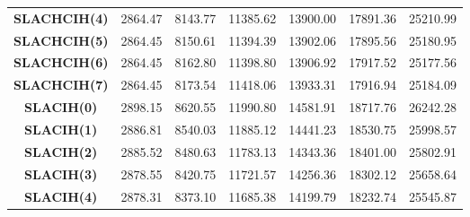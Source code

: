 \begin{landscape}
{\begin{table}[]
{\begin{tabular}{|c|cccccc|}
\textbf{SLACHCIH(4)}                 & 2864.47                        & 8143.77                        & {\color[HTML]{FE0000} 11385.62} & {\color[HTML]{FE0000} 13900.00} & {\color[HTML]{FE0000} 17891.36} & 25210.99                        \\
\rowcolor[HTML]{EFEFEF} 
\textbf{SLACHCIH(5)}                 & 2864.45                        & 8150.61                        & 11394.39                        & 13902.06                        & 17895.56                        & 25180.95                        \\
\textbf{SLACHCIH(6)}                 & 2864.45                        & 8162.80                        & 11398.80                        & 13906.92                        & 17917.52                        & {\color[HTML]{FE0000} 25177.56} \\
\rowcolor[HTML]{EFEFEF} 
\textbf{SLACHCIH(7)}                 & 2864.45                        & 8173.54                        & 11418.06                        & 13933.31                        & 17916.94                        & 25184.09                        \\
\textbf{SLACIH(0)}                   & 2898.15                        & 8620.55                        & 11990.80                        & 14581.91                        & 18717.76                        & 26242.28                        \\
\rowcolor[HTML]{EFEFEF} 
\textbf{SLACIH(1)}                   & 2886.81                        & 8540.03                        & 11885.12                        & 14441.23                        & 18530.75                        & 25998.57                        \\
\textbf{SLACIH(2)}                   & 2885.52                        & 8480.63                        & 11783.13                        & 14343.36                        & 18401.00                        & 25802.91                        \\
\rowcolor[HTML]{EFEFEF} 
\textbf{SLACIH(3)}                   & 2878.55                        & 8420.75                        & 11721.57                        & 14256.36                        & 18302.12                        & 25658.64                        \\
\textbf{SLACIH(4)}                   & 2878.31                        & 8373.10                        & 11685.38                        & 14199.79                        & 18232.74                        & 25545.87                        \\

\end{tabular}}
\end{table}}
\end{landscape}
